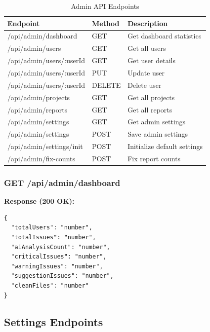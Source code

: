 \documentclass[12pt,a4paper]{article}
\begin{document}
    \begin{table}[H]
        \caption{Admin API Endpoints}
        \begin{tabular}{|l|l|p{5cm}|}
            \hline
            \textbf{Endpoint} & \textbf{Method} & \textbf{Description} \\
            \hline
            /api/admin/dashboard & GET & Get dashboard statistics \\
            \hline
            /api/admin/users & GET & Get all users \\
            \hline
            /api/admin/users/:userId & GET & Get user details \\
            \hline
            /api/admin/users/:userId & PUT & Update user \\
            \hline
            /api/admin/users/:userId & DELETE & Delete user \\
            \hline
            /api/admin/projects & GET & Get all projects \\
            \hline
            /api/admin/reports & GET & Get all reports \\
            \hline
            /api/admin/settings & GET & Get admin settings \\
            \hline
            /api/admin/settings & POST & Save admin settings \\
            \hline
            /api/admin/settings/init & POST & Initialize default settings \\
            \hline
            /api/admin/fix-counts & POST & Fix report counts \\
            \hline
        \end{tabular}
    \end{table}

    \subsubsection{GET /api/admin/dashboard}

    \textbf{Response (200 OK):}
    \begin{verbatim}
{
  "totalUsers": "number",
  "totalIssues": "number",
  "aiAnalysisCount": "number",
  "criticalIssues": "number",
  "warningIssues": "number",
  "suggestionIssues": "number",
  "cleanFiles": "number"
}
    \end{verbatim}

    \subsection{Settings Endpoints}
\end{document}

